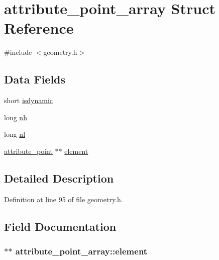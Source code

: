 \hypertarget{structattribute__point__array}{\section{attribute\-\_\-point\-\_\-array Struct Reference}
\label{structattribute__point__array}
}


{\ttfamily \#include $<$geometry.\-h$>$}

\subsection*{Data Fields}
\begin{DoxyCompactItemize}
\item 
short \hyperlink{structattribute__point__array_a73e73b0b2d8c28badf5fb14bbde5d6d7}{isdynamic}
\item 
long \hyperlink{structattribute__point__array_ab8acf4ef196e34d03915bb772500eff6}{nh}
\item 
long \hyperlink{structattribute__point__array_a401844fea269cc945dc58f9b2d527471}{nl}
\item 
\hyperlink{geometry_8h_aa98f9dd0215d1e59c7c6b60dd2833470}{attribute\-\_\-point} $\ast$$\ast$ \hyperlink{structattribute__point__array_a301f326fe8aeff6cc63deab54ceae4b4}{element}
\end{DoxyCompactItemize}


\subsection{Detailed Description}


Definition at line 95 of file geometry.\-h.



\subsection{Field Documentation}
\hypertarget{structattribute__point__array_a301f326fe8aeff6cc63deab54ceae4b4}{
\subsubsection[{element}]{$\ast$$\ast$ attribute\-\_\-point\-\_\-array\-::element}}\label{structattribute__point__array_a301f326fe8aeff6cc63deab54ceae4b4}


